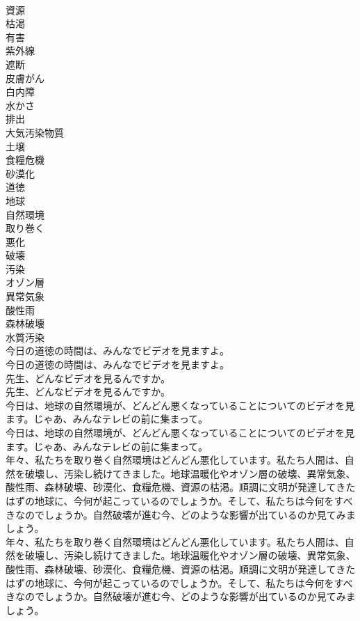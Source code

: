 \documentclass[8pt]{extreport}
\begin{document}
\begin{CJK}{UTF8}{min}
\\	資源
\\	枯渇
\\	有害
\\	紫外線
\\	遮断
\\	皮膚がん
\\	白内障
\\	水かさ
\\	排出
\\	大気汚染物質
\\	土壌
\\	食糧危機
\\	砂漠化
\\	道徳
\\	地球
\\	自然環境
\\	取り巻く
\\	悪化
\\	破壊
\\	汚染
\\	オゾン層
\\	異常気象
\\	酸性雨
\\	森林破壊
\\	水質汚染
\\	今日の道徳の時間は、みんなでビデオを見ますよ。	
\\	今日の道徳の時間は、みんなでビデオを見ますよ。 
\\	先生、どんなビデオを見るんですか。	
\\	先生、どんなビデオを見るんですか。 
\\	今日は、地球の自然環境が、どんどん悪くなっていることについてのビデオを見ます。じゃあ、みんなテレビの前に集まって。	
\\	今日は、地球の自然環境が、どんどん悪くなっていることについてのビデオを見ます。じゃあ、みんなテレビの前に集まって。 
\\	年々、私たちを取り巻く自然環境はどんどん悪化しています。私たち人間は、自然を破壊し、汚染し続けてきました。地球温暖化やオゾン層の破壊、異常気象、酸性雨、森林破壊、砂漠化、食糧危機、資源の枯渇。順調に文明が発達してきたはずの地球に、今何が起こっているのでしょうか。そして、私たちは今何をすべきなのでしょうか。自然破壊が進む今、どのような影響が出ているのか見てみましょう。	
\\	年々、私たちを取り巻く自然環境はどんどん悪化しています。私たち人間は、自然を破壊し、汚染し続けてきました。地球温暖化やオゾン層の破壊、異常気象、酸性雨、森林破壊、砂漠化、食糧危機、資源の枯渇。順調に文明が発達してきたはずの地球に、今何が起こっているのでしょうか。そして、私たちは今何をすべきなのでしょうか。自然破壊が進む今、どのような影響が出ているのか見てみましょう。 

\end{CJK}
\end{document}
